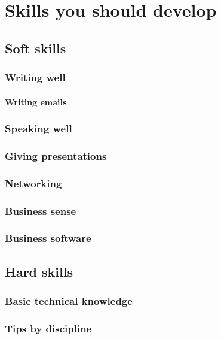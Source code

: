 \chapter{Skills you should develop}
\section{Soft skills}
\subsection{Writing well}
\subsubsection{Writing emails}
\subsection{Speaking well}
\subsection{Giving presentations}
\subsection{Networking}
\subsection{Business sense}
\subsection{Business software}

\section{Hard skills}
\subsection{Basic technical knowledge}
\subsection{Tips by discipline}
